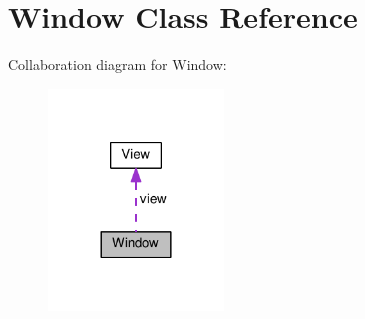 \hypertarget{classWindow}{}\section{Window Class Reference}
\label{classWindow}


Collaboration diagram for Window\+:
\nopagebreak
\begin{figure}[H]
\begin{center}
\leavevmode
\includegraphics[width=132pt]{classWindow__coll__graph}
\end{center}
\end{figure}
